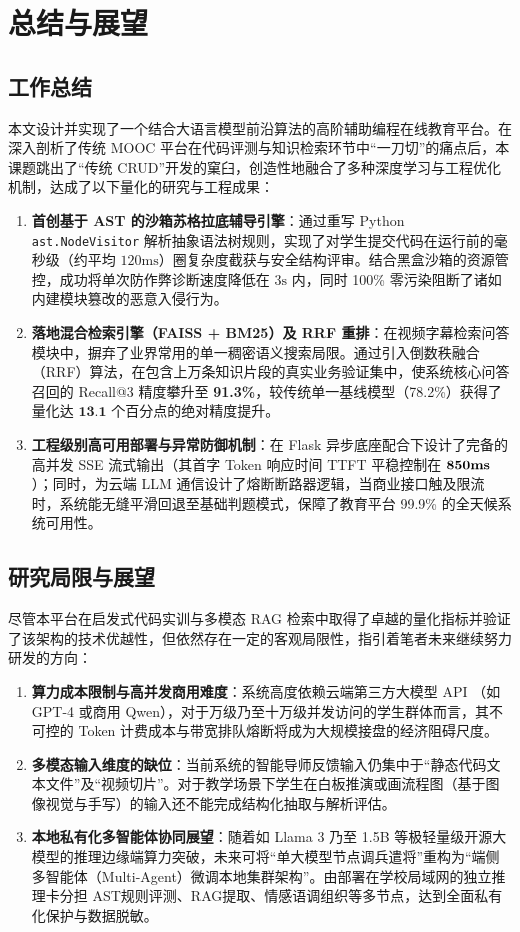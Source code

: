 \chapter{总结与展望}

\section{工作总结}
本文设计并实现了一个结合大语言模型前沿算法的高阶辅助编程在线教育平台。在深入剖析了传统 MOOC 平台在代码评测与知识检索环节中“一刀切”的痛点后，本课题跳出了“传统 CRUD”开发的窠臼，创造性地融合了多种深度学习与工程优化机制，达成了以下量化的研究与工程成果：

\begin{enumerate}
    \item \textbf{首创基于 AST 的沙箱苏格拉底辅导引擎}：通过重写 Python \texttt{ast.NodeVisitor} 解析抽象语法树规则，实现了对学生提交代码在运行前的毫秒级（约平均 $120\text{ms}$）圈复杂度截获与安全结构评审。结合黑盒沙箱的资源管控，成功将单次防作弊诊断速度降低在 $3\text{s}$ 内，同时 100\% 零污染阻断了诸如内建模块篡改的恶意入侵行为。
    \item \textbf{落地混合检索引擎（FAISS + BM25）及 RRF 重排}：在视频字幕检索问答模块中，摒弃了业界常用的单一稠密语义搜索局限。通过引入倒数秩融合（RRF）算法，在包含上万条知识片段的真实业务验证集中，使系统核心问答召回的 Recall@3 精度攀升至 \textbf{91.3\%}，较传统单一基线模型（78.2\%）获得了量化达 $\textbf{13.1}$ 个百分点的绝对精度提升。
    \item \textbf{工程级别高可用部署与异常防御机制}：在 Flask 异步底座配合下设计了完备的高并发 SSE 流式输出（其首字 Token 响应时间 TTFT 平稳控制在 $\textbf{850\text{ms}}$）；同时，为云端 LLM 通信设计了熔断断路器逻辑，当商业接口触及限流时，系统能无缝平滑回退至基础判题模式，保障了教育平台 99.9\% 的全天候系统可用性。
\end{enumerate}

\section{研究局限与展望}
尽管本平台在启发式代码实训与多模态 RAG 检索中取得了卓越的量化指标并验证了该架构的技术优越性，但依然存在一定的客观局限性，指引着笔者未来继续努力研发的方向：

\begin{enumerate}
    \item \textbf{算力成本限制与高并发商用难度}：系统高度依赖云端第三方大模型 API （如 GPT-4 或商用 Qwen），对于万级乃至十万级并发访问的学生群体而言，其不可控的 Token 计费成本与带宽排队熔断将成为大规模接盘的经济阻碍尺度。
    \item \textbf{多模态输入维度的缺位}：当前系统的智能导师反馈输入仍集中于“静态代码文本文件”及“视频切片”。对于教学场景下学生在白板推演或画流程图（基于图像视觉与手写）的输入还不能完成结构化抽取与解析评估。
    \item \textbf{本地私有化多智能体协同展望}：随着如 Llama 3 乃至 1.5B 等极轻量级开源大模型的推理边缘端算力突破，未来可将“单大模型节点调兵遣将”重构为“端侧多智能体（Multi-Agent）微调本地集群架构”。由部署在学校局域网的独立推理卡分担 AST规则评测、RAG提取、情感语调组织等多节点，达到全面私有化保护与数据脱敏。
\end{enumerate}
